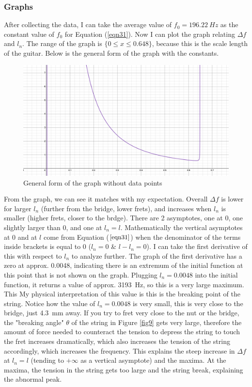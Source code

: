 \documentclass[11pt]{article}
\begin{document}
\begin{flushleft}
            \subsubsection*{Graphs}    
                After collecting the data, I can take the average value of $f_0 = \SI{196.22}{Hz}$ as the constant value of $f_0$ for Equation (\ref{eqn31}). Now I can plot the graph relating $\Delta f$ and $l_n$. The range of the graph is $\{0 \le x \le 0.648 \}$, because this is the scale length of the guitar. Below is the general form of the graph with the constants. \\
                \begin{figure}[h!]
                    \includegraphics[width = \textwidth]{no_data_graph.png}
                    \caption{General form of the graph without data points} \label{fig8}
                \end{figure}
                From the graph, we can see it matches with my expectation. Overall $\Delta f$ is lower for larger $l_n$ (further from the bridge, lower frets), and increases when $l_n$ is smaller (higher frets, closer to the brdge). There are 2 asymptotes, one at 0, one slightly larger than 0, and one at $l_n = l$. Mathematically the vertical asymptotes at 0 and at $l$ come from Equation ($\ref{eqn31}$) when the denominator of the terms inside brackets is equal to 0 ($l_n = 0$ \& $l-l_n = 0$). 
                I can take the first derivative of this with respect to $l_n$ to analyze further. The graph of the first derivative has a zero at approx. 0.0048, indicating there is an extremum of the initial function at this point that is not shown on the graph. Plugging $l_n = 0.0048$ into the initial function, it returns a value of approx. \SI{3193}{Hz}, so this is a very large maximum. This 
                My physical interpretation of this value is this is the breaking point of the string. Notice how the value of $l_n = 0.0048$ is very small, this is very close to the bridge, just \SI{4.3}{mm} away. If you try to fret very close to the nut or the bridge, the "breaking angle" $\theta$ of the string in Figure \ref{fig9} gets very large, therefore the amount of force needed to counteract the tension to depress the string to touch the fret increases dramatically, which also increases the tension of the string accordingly, which increases the frequency. This explains the steep increase in $\Delta f$ at $l_n = l$ (tending to $+\infty$ as a vertical asymptote) and the maxima. At the maxima, the tension in the string gets too large and the string break, explaining the abnormal peak. 

\end{flushleft}
\end{document}
